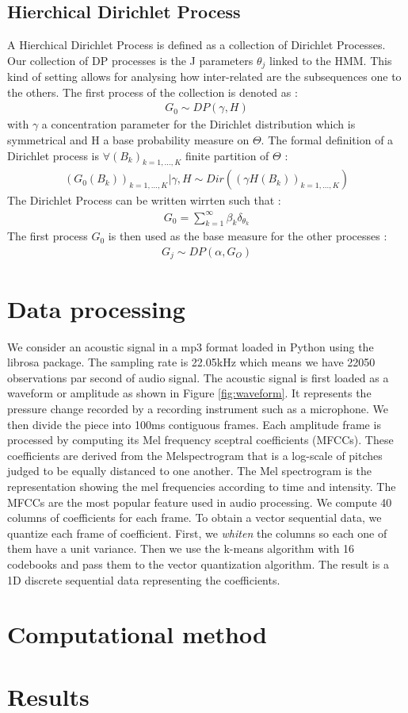 \subsection{Hierchical Dirichlet Process}
A Hierchical Dirichlet Process is defined as a collection of Dirichlet Processes. Our collection of DP processes is the J parameters $\theta_j$ linked to the HMM. This kind of setting allows for analysing how inter-related are the subsequences one to the others. The first process of the collection is denoted as : 
\begin{align*}
	G_0\sim DP(\gamma, H)
\end{align*}
with $\gamma$ a concentration parameter for the Dirichlet distribution which is symmetrical and H a base probability measure on $\Theta$. The formal definition of a Dirichlet process is $\forall (B_k)_{k=1,\dots, K}$ finite partition of $\Theta$ : \begin{align*}
	(G_0(B_k))_{k=1,\dots, K}|\gamma, H \sim Dir( (\gamma H(B_k))_{k=1,\dots, K})
\end{align*}
The Dirichlet Process can be written wirrten such that :
\begin{align*}
	G_0=\sum^\infty_{k=1} \beta_k \delta_{\theta_k}
\end{align*}
The first process $G_0$ is then used as the base measure for the other processes : \begin{align*}
	G_j \sim DP(\alpha, G_O)
\end{align*} 

\section{Data processing}
We consider an acoustic signal in a mp3 format loaded in Python using the librosa package. The sampling rate is 22.05kHz which means we have 22050 observations par second of audio signal. The acoustic signal is first loaded as a waveform or amplitude as shown in Figure \ref{fig:waveform}. It represents the pressure change recorded by a recording instrument such as a microphone. We then divide the piece into 100ms contiguous frames. Each amplitude frame is processed by computing its Mel frequency sceptral coefficients (MFCCs). These coefficients are derived from the Melspectrogram that is a log-scale of pitches judged to be equally distanced to one another. The Mel spectrogram is the representation showing the mel frequencies according to time and intensity. The MFCCs are the most popular feature used in audio processing. We compute 40 columns of coefficients for each frame. To obtain a vector sequential data, we quantize each frame of coefficient. First, we \textit{whiten} the columns so each one of them have a unit variance. Then we use the k-means algorithm with 16 codebooks and pass them to the vector quantization algorithm. The result is a 1D discrete sequential data representing the coefficients. 



\section{Computational method}

\section{Results}


